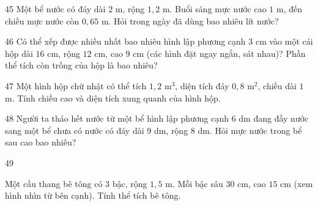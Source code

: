 \gap
\begin{probbox}{45}{}
Một bể nước có đáy dài $2$ m, rộng $1{,}2$ m. Buổi sáng mực nước cao $1$ m, đến chiều mực nước còn $0{,}65$ m. Hỏi trong ngày đã dùng bao nhiêu lít nước?
\end{probbox}
\gap
\begin{probbox}{46}{}
Có thể xếp được nhiều nhất bao nhiêu hình lập phương cạnh $3$ cm vào một cái hộp dài $16$ cm, rộng $12$ cm, cao $9$ cm (các hình đặt ngay ngắn, sát nhau)? Phần thể tích còn trống của hộp là bao nhiêu?
\end{probbox}
\gap
\begin{probbox}{47}{}
Một hình hộp chữ nhật có thể tích $1{,}2$ m$^3$, diện tích đáy $0{,}8$ m$^2$, chiều dài $1$ m. Tính chiều cao và diện tích xung quanh của hình hộp.
\end{probbox}
\gap
\begin{probbox}{48}{}
Người ta tháo hết nước từ một bể hình lập phương cạnh $6$ dm đang đầy nước sang một bể chưa có nước có đáy dài $9$ dm, rộng $8$ dm. Hỏi mực nước trong bể sau cao bao nhiêu?
\end{probbox}
\gap
\begin{probbox}{49}{}
\begin{minipage}[t]{0.6\linewidth}
Một cầu thang bê tông có $3$ bậc, rộng $1{,}5$ m. Mỗi bậc sâu $30$ cm, cao $15$ cm (xem hình nhìn từ bên cạnh). Tính thể tích bê tông.
\end{minipage}\hfill
\begin{minipage}[t]{0.36\linewidth}\vspace{0pt}\centering
{}
\end{minipage}
\end{probbox}
